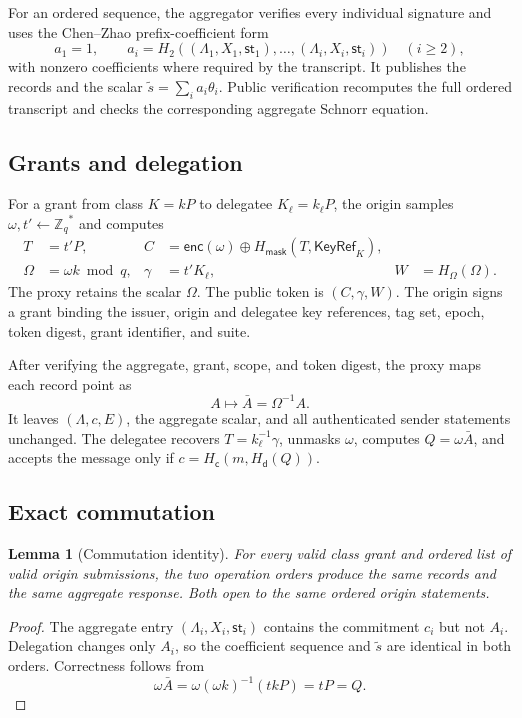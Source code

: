 \documentclass[11pt,letterpaper]{article}
\newtheorem{lemma}[theorem]{Lemma}
\theoremstyle{definition}
\theoremstyle{remark}
\newcommand{\Zq}{\ensuremath{\mathbb{Z}_q}}
\newcommand{\KeyRef}{\ensuremath{\mathsf{KeyRef}}}
\newcommand{\Hd}{\ensuremath{H_{\mathsf d}}}
\newcommand{\Hc}{\ensuremath{H_{\mathsf c}}}
\newcommand{\Hmask}{\ensuremath{H_{\mathsf{mask}}}}
\newcommand{\HOmega}{\ensuremath{H_{\Omega}}}
\begin{document}
For an ordered sequence, the aggregator verifies every individual signature and
uses the Chen--Zhao prefix-coefficient form
\[
 a_1=1,\qquad
 a_i=H_2((\Lambda_1,X_1,\mathsf{st}_1),\ldots,
          (\Lambda_i,X_i,\mathsf{st}_i))\quad(i\ge2),
\]
with nonzero coefficients where required by the transcript.  It publishes the
records and the scalar
\(\widetilde s=\sum_i a_i\theta_i\).  Public verification recomputes the full
ordered transcript and checks the corresponding aggregate Schnorr equation.

\subsection{Grants and delegation}

For a grant from class \(K=kP\) to delegatee \(K_\ell=k_\ell P\), the origin
samples \(\omega,t'\leftarrow\Zq^*\) and computes
\begin{align*}
 T&=t'P, &
 C&=\mathsf{enc}(\omega)\oplus\Hmask(T,\KeyRef_K),\\
 \Omega&=\omega k\bmod q, &
 \gamma&=t'K_\ell, & W&=\HOmega(\Omega).
\end{align*}
The proxy retains the scalar \(\Omega\).  The public token is \((C,\gamma,W)\).
The origin signs a grant binding the issuer, origin and delegatee key references,
tag set, epoch, token digest, grant identifier, and suite.

After verifying the aggregate, grant, scope, and token digest, the proxy maps each
record point as
\[
  A\longmapsto \bar A=\Omega^{-1}A.
\]
It leaves \((\Lambda,c,E)\), the aggregate scalar, and all authenticated sender
statements unchanged.  The delegatee recovers
\(T=k_\ell^{-1}\gamma\), unmasks \(\omega\), computes
\(Q=\omega\bar A\), and accepts the message only if
\(c=\Hc(m,\Hd(Q))\).

\subsection{Exact commutation}

\begin{lemma}[Commutation identity]
For every valid class grant and ordered list of valid origin submissions, the two
operation orders produce the same records and
the same aggregate response.  Both open to the same ordered origin statements.
\end{lemma}

\begin{proof}
The aggregate entry \((\Lambda_i,X_i,\mathsf{st}_i)\) contains the commitment
\(c_i\) but not \(A_i\).  Delegation changes only \(A_i\), so the coefficient
sequence and \(\widetilde s\) are identical in both orders.  Correctness follows
from
\[
  \omega\bar A=\omega(\omega k)^{-1}(tkP)=tP=Q.
\]
\end{proof}
\end{document}
